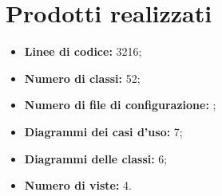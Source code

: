

\section{Prodotti realizzati}\label{sec:prodotti-ottenuti}


\begin{itemize}
    \item \textbf{Linee di codice:} 3216;
    \item \textbf{Numero di classi:} 52;
    \item \textbf{Numero di file di configurazione:} ;
    \item \textbf{Diagrammi dei casi d'uso:} 7;
    \item \textbf{Diagrammi delle classi:} 6;
    \item \textbf{Numero di viste:} 4.
\end{itemize}
